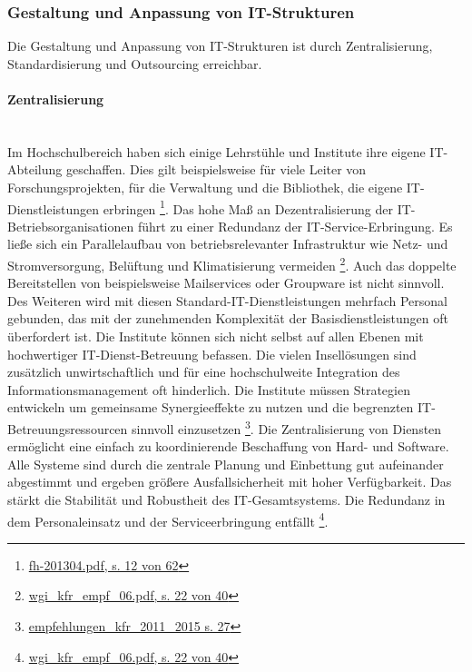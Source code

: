 \subsubsection{Gestaltung und Anpassung von IT-Strukturen}
\label{subsubsection_gestaltung_IT_strukturen}
Die Gestaltung und Anpassung von IT-Strukturen ist durch Zentralisierung, Standardisierung und Outsourcing erreichbar.


\paragraph{Zentralisierung}\mbox{}\\
Im Hochschulbereich haben sich einige Lehrstühle und Institute ihre eigene IT-Abteilung geschaffen. Dies gilt beispielsweise für viele Leiter von Forschungsprojekten, für die Verwaltung und die Bibliothek, die eigene IT-Dienstleistungen erbringen \footnote{\url{fh-201304.pdf, s. 12 von 62}}. Das hohe Maß an Dezentralisierung der IT-Betriebsorganisationen führt zu einer Redundanz der IT-Service-Erbringung. Es ließe sich ein Parallelaufbau von betriebsrelevanter Infrastruktur wie Netz- und Stromversorgung, Belüftung und Klimatisierung vermeiden \footnote{\url{wgi_kfr_empf_06.pdf, s. 22 von 40}}. Auch das doppelte Bereitstellen von beispielsweise Mailservices oder Groupware ist nicht sinnvoll. Des Weiteren wird mit diesen Standard-IT-Dienstleistungen mehrfach Personal gebunden, das mit der zunehmenden Komplexität der Basisdienstleistungen oft überfordert ist. 
Die Institute können sich nicht selbst auf allen Ebenen mit hochwertiger IT-Dienst-Betreuung befassen. Die vielen Insellösungen sind zusätzlich unwirtschaftlich und für eine hochschulweite Integration des Informationsmanagement oft hinderlich. Die Institute müssen Strategien entwickeln um gemeinsame Synergieeffekte zu nutzen und die begrenzten IT-Betreuungsressourcen sinnvoll einzusetzen \footnote{\url{empfehlungen_kfr_2011_2015 s. 27}}.
Die Zentralisierung von Diensten ermöglicht eine einfach zu koordinierende Beschaffung von Hard- und Software. Alle Systeme sind durch die zentrale Planung und Einbettung gut aufeinander abgestimmt und ergeben größere Ausfallsicherheit mit hoher Verfügbarkeit. Das stärkt die Stabilität und Robustheit des IT-Gesamtsystems. Die Redundanz in dem Personaleinsatz und der Serviceerbringung entfällt \footnote{\url{wgi_kfr_empf_06.pdf, s. 22 von 40}}. 


